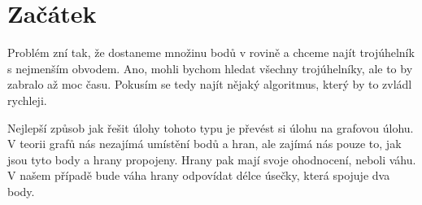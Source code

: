 \section{Začátek}
\label{sec:zacatek}

Problém zní tak, že dostaneme množinu bodů v rovině a chceme najít trojúhelník s nejmenším obvodem. Ano, mohli bychom hledat všechny trojúhelníky, ale to by zabralo až moc času. Pokusím se tedy najít nějaký algoritmus, který by to zvládl rychleji.

Nejlepší způsob jak řešit úlohy tohoto typu je převést si úlohu na grafovou úlohu. V teorii grafů nás nezajímá umístění bodů a hran, ale zajímá nás pouze to, jak jsou tyto body a hrany propojeny. Hrany pak mají svoje ohodnocení, neboli váhu. V našem případě bude váha hrany odpovídat délce úsečky, která spojuje dva body.